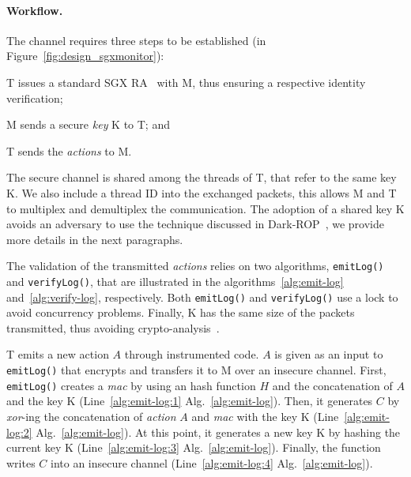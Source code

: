 \paragraph{Workflow.}
The channel requires three steps to be established (\circled[3] in 
Figure~\ref{fig:design_sgxmonitor}):
\begin{enumerate*}[label=(\roman*)]
	\item T issues a standard SGX RA~\citep{anati2013innovative} with M, thus 
	ensuring a respective identity verification;
	\item M sends a secure \emph{key} K to T; and
	\item T sends the \emph{actions} to M.
\end{enumerate*}
The secure channel is shared among the threads of T, that refer to the same 
key K.
We also include a thread ID into the exchanged packets, this allows M and T to 
multiplex and demultiplex the communication.
The adoption of a shared key K avoids an adversary to use 
the technique discussed in Dark-ROP~\citep{lee2017hacking}, we provide more 
details in the next paragraphs.

The validation of the transmitted \emph{actions} relies on two algorithms, 
\texttt{emitLog()} and \texttt{verifyLog()}, that are illustrated in the
algorithms~\ref{alg:emit-log} and~\ref{alg:verify-log}, respectively.
Both \texttt{emitLog()} and \texttt{verifyLog()} use a lock to avoid
concurrency problems.
Finally, K has the same size of the packets transmitted, thus avoiding 
crypto-analysis~\citep{horstmeyer2013physical}.

T emits a new action $A$ through instrumented code.
$A$ is given as an input to \texttt{emitLog()} that encrypts and transfers it 
to M over an insecure channel.
First,  \texttt{emitLog()} creates a \emph{mac} by using an hash function $H$ 
and the concatenation of $A$ and the key K (Line~\ref{alg:emit-log:1}  
Alg.~\ref{alg:emit-log}).
Then, it generates $C$ by \emph{xor}-ing the concatenation of \emph{action} $A$ 
and \emph{mac} with the key K (Line~\ref{alg:emit-log:2} 
Alg.~\ref{alg:emit-log}).
At this point, it generates a new key K by hashing the 
current key K (Line~\ref{alg:emit-log:3} Alg.~\ref{alg:emit-log}).
Finally, the function writes $C$ into an insecure channel 
(Line~\ref{alg:emit-log:4} Alg.~\ref{alg:emit-log}).

